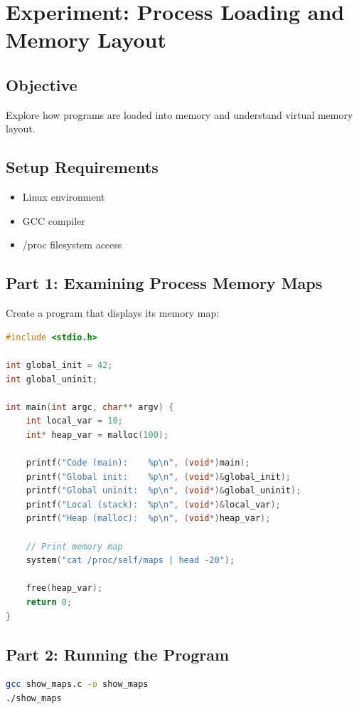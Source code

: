 \section{Experiment: Process Loading and Memory Layout}

\subsection{Objective}
Explore how programs are loaded into memory and understand virtual memory layout.

\subsection{Setup Requirements}
\begin{itemize}
\item Linux environment
\item GCC compiler
\item /proc filesystem access
\end{itemize}

\subsection{Part 1: Examining Process Memory Maps}

Create a program that displays its memory map:

\begin{lstlisting}[language=C]
#include <stdio.h>

int global_init = 42;
int global_uninit;

int main(int argc, char** argv) {
    int local_var = 10;
    int* heap_var = malloc(100);
    
    printf("Code (main):    %p\n", (void*)main);
    printf("Global init:    %p\n", (void*)&global_init);
    printf("Global uninit:  %p\n", (void*)&global_uninit);
    printf("Local (stack):  %p\n", (void*)&local_var);
    printf("Heap (malloc):  %p\n", (void*)heap_var);
    
    // Print memory map
    system("cat /proc/self/maps | head -20");
    
    free(heap_var);
    return 0;
}
\end{lstlisting}

\subsection{Part 2: Running the Program}

\begin{lstlisting}[language=bash]
gcc show_maps.c -o show_maps
./show_maps
\end{lstlisting}

